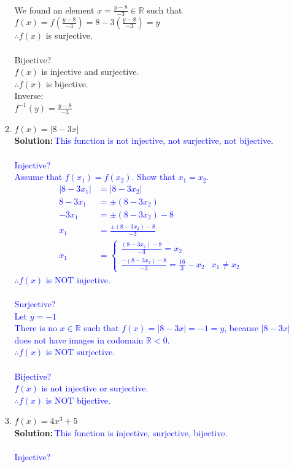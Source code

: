 \documentclass{article}
\newcommand{\sol}[1]{\textbf{Solution:\,}\textcolor{blue}{#1}}
\begin{document}
\begin{enumerate}
\begin{enumerate}
{\\We found an element $x=\frac{y-8}{-3}\in\mathbb{R}$ such that $f(x)=f(\frac{y-8}{-3})=8-3(\frac{y-8}{-3})=y$
\\$\therefore f(x)$ is surjective.
\\\\Bijective?
\\$f(x)$ is injective and surjective.
\\$\therefore f(x)$ is bijective.
\\Inverse:
\\$f^{-1}(y)=\frac{y-8}{-3}$
}\\
\item $f(x) = |8 - 3 x|$
\\\sol{This function is not injective, not surjective, not bijective.
\\\\Injective?
\\Assume that $f(x_1)=f(x_2)$. Show that $x_1=x_2$.
\begin{align*}
|8-3x_1|&=|8-3x_2|&\text{}\\
8-3x_1&=\pm(8-3x_2)&\text{}\\
-3x_1&=\pm(8-3x_2)-8&\text{}\\
x_1&=\frac{\pm(8-3x_2)-8}{-3}&\text{}\\
x_1&=\begin{cases}\frac{(8-3x_2)-8}{-3}=x_2&\text{}\\\frac{-(8-3x_2)-8}{-3}=\frac{16}{3}-x_2&\text{$x_1\neq x_2$}\end{cases}
\end{align*}
$\therefore f(x)$ is NOT injective.
\\\\Surjective?
\\Let $y=-1$
\\There is no $x\in\mathbb{R}$ such that $f(x)=|8 - 3 x|=-1=y$, because $|8 - 3 x|$ does not have images in codomain $\mathbb{R}<0$.
\\$\therefore f(x)$ is NOT surjective.
\\\\Bijective?
\\$f(x)$ is not injective or surjective.
\\$\therefore f(x)$ is NOT bijective.
}\\
\item $f(x) = 4x^3 + 5$
\\\sol{This function is injective, surjective, bijective.
\\\\Injective?
}
\end{enumerate}
\end{enumerate}
\end{document}
